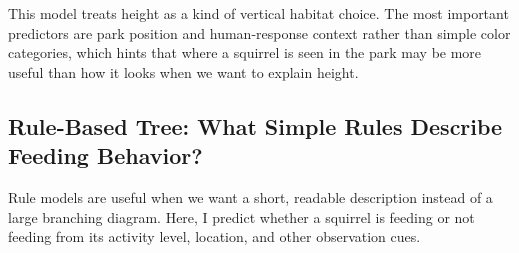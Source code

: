 \documentclass[
  11pt,
]{article}
\newenvironment{Shaded}{\begin{snugshade}}{\end{snugshade}}
\newcommand{\AttributeTok}[1]{\textcolor[rgb]{0.13,0.29,0.53}{#1}}
\newcommand{\ConstantTok}[1]{\textcolor[rgb]{0.56,0.35,0.01}{#1}}
\newcommand{\DecValTok}[1]{\textcolor[rgb]{0.00,0.00,0.81}{#1}}
\newcommand{\FunctionTok}[1]{\textcolor[rgb]{0.13,0.29,0.53}{\textbf{#1}}}
\newcommand{\NormalTok}[1]{#1}
\newcommand{\OtherTok}[1]{\textcolor[rgb]{0.56,0.35,0.01}{#1}}
\newcommand{\SpecialCharTok}[1]{\textcolor[rgb]{0.81,0.36,0.00}{\textbf{#1}}}
\newcommand{\StringTok}[1]{\textcolor[rgb]{0.31,0.60,0.02}{#1}}
\begin{document}
This model treats height as a kind of vertical habitat choice. The most
important predictors are park position and human-response context rather
than simple color categories, which hints that where a squirrel is seen
in the park may be more useful than how it looks when we want to explain
height.

\subsection{Rule-Based Tree: What Simple Rules Describe Feeding
Behavior?}\label{rule-based-tree-what-simple-rules-describe-feeding-behavior}

Rule models are useful when we want a short, readable description
instead of a large branching diagram. Here, I predict whether a squirrel
is feeding or not feeding from its activity level, location, and other
observation cues.

\begin{Shaded}
\end{Shaded}
\end{document}
